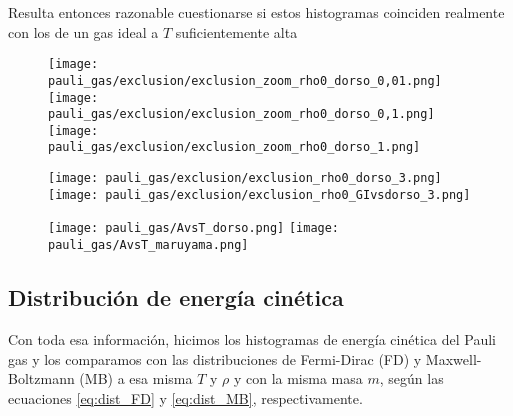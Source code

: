 Resulta entonces razonable cuestionarse si estos histogramas coinciden realmente con los de un gas ideal a $T$ suficientemente alta



\begin{figure}[H]
	\centering	%
	\texttt{[image: pauli\_gas/exclusion/exclusion\_zoom\_rho0\_dorso\_0,01.png]}
	\texttt{[image: pauli\_gas/exclusion/exclusion\_zoom\_rho0\_dorso\_0,1.png]}
	\texttt{[image: pauli\_gas/exclusion/exclusion\_zoom\_rho0\_dorso\_1.png]}
	\caption{}
	\label{fig:exclusion_zoom_rho0_dorso}
\end{figure}


\begin{figure}[H]
	\centering	%
	\texttt{[image: pauli\_gas/exclusion/exclusion\_rho0\_dorso\_3.png]}
	\texttt{[image: pauli\_gas/exclusion/exclusion\_rho0\_GIvsdorso\_3.png]}
	\caption{}
	\label{fig:exclusion_dorso_vs_GI}
\end{figure}



\begin{figure}[H]
	\centering	%
	\texttt{[image: pauli\_gas/AvsT\_dorso.png]}
	\texttt{[image: pauli\_gas/AvsT\_maruyama.png]}
	\caption{}
	\label{fig:AvsT}
\end{figure}


\subsection{Distribución de energía cinética}{\label{sec:dist_energ}}

Con toda esa información, hicimos los histogramas de energía cinética del Pauli gas y los comparamos con las distribuciones de Fermi-Dirac (FD) y Maxwell-Boltzmann (MB)
a esa misma $T$ y $\rho$ y con la misma masa $m$, según las ecuaciones \eqref{eq:dist_FD} y \eqref{eq:dist_MB}, respectivamente.

